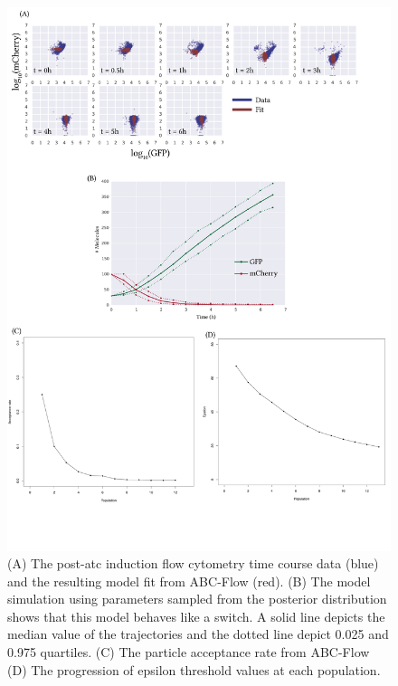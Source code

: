 \begin{figure}[tb]
\centerfloat
	\includegraphics[width=1.2\textwidth]{../../chapters/chapterABCFlow/images/2D_real_res-01.png}
	\caption[ABC-Flow fit to post-\acrshort{atc} time course data]{\label{fig:1d-real-res} (A) The post-\acrshort{atc} induction flow cytometry time course data (blue) and the resulting model fit from ABC-Flow (red). (B) The model simulation using parameters sampled from the posterior distribution shows that this model behaves like a switch. A solid line depicts the median value of the trajectories and the dotted line depict 0.025 and 0.975 quartiles. (C) The particle acceptance rate from ABC-Flow (D) The progression of epsilon threshold values at each population.}
\end{figure}



